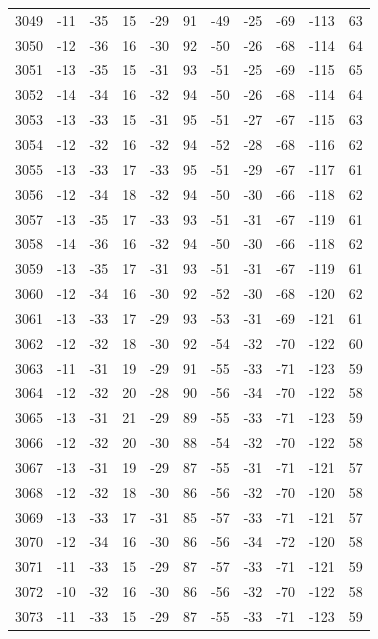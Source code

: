 \begin{table}[H]
\begin{tabular}{lllllllllll}
3049 & -11 & -35 & 15 & -29 & 91 & -49 & -25 & -69 & -113 & 63 \\
3050 & -12 & -36 & 16 & -30 & 92 & -50 & -26 & -68 & -114 & 64 \\
3051 & -13 & -35 & 15 & -31 & 93 & -51 & -25 & -69 & -115 & 65 \\
3052 & -14 & -34 & 16 & -32 & 94 & -50 & -26 & -68 & -114 & 64 \\
3053 & -13 & -33 & 15 & -31 & 95 & -51 & -27 & -67 & -115 & 63 \\
3054 & -12 & -32 & 16 & -32 & 94 & -52 & -28 & -68 & -116 & 62 \\
3055 & -13 & -33 & 17 & -33 & 95 & -51 & -29 & -67 & -117 & 61 \\
3056 & -12 & -34 & 18 & -32 & 94 & -50 & -30 & -66 & -118 & 62 \\
3057 & -13 & -35 & 17 & -33 & 93 & -51 & -31 & -67 & -119 & 61 \\
3058 & -14 & -36 & 16 & -32 & 94 & -50 & -30 & -66 & -118 & 62 \\
3059 & -13 & -35 & 17 & -31 & 93 & -51 & -31 & -67 & -119 & 61 \\
3060 & -12 & -34 & 16 & -30 & 92 & -52 & -30 & -68 & -120 & 62 \\
3061 & -13 & -33 & 17 & -29 & 93 & -53 & -31 & -69 & -121 & 61 \\
3062 & -12 & -32 & 18 & -30 & 92 & -54 & -32 & -70 & -122 & 60 \\
3063 & -11 & -31 & 19 & -29 & 91 & -55 & -33 & -71 & -123 & 59 \\
3064 & -12 & -32 & 20 & -28 & 90 & -56 & -34 & -70 & -122 & 58 \\
3065 & -13 & -31 & 21 & -29 & 89 & -55 & -33 & -71 & -123 & 59 \\
3066 & -12 & -32 & 20 & -30 & 88 & -54 & -32 & -70 & -122 & 58 \\
3067 & -13 & -31 & 19 & -29 & 87 & -55 & -31 & -71 & -121 & 57 \\
3068 & -12 & -32 & 18 & -30 & 86 & -56 & -32 & -70 & -120 & 58 \\
3069 & -13 & -33 & 17 & -31 & 85 & -57 & -33 & -71 & -121 & 57 \\
3070 & -12 & -34 & 16 & -30 & 86 & -56 & -34 & -72 & -120 & 58 \\
3071 & -11 & -33 & 15 & -29 & 87 & -57 & -33 & -71 & -121 & 59 \\
3072 & -10 & -32 & 16 & -30 & 86 & -56 & -32 & -70 & -122 & 58 \\
3073 & -11 & -33 & 15 & -29 & 87 & -55 & -33 & -71 & -123 & 59 \\

\end{tabular}
\end{table}
